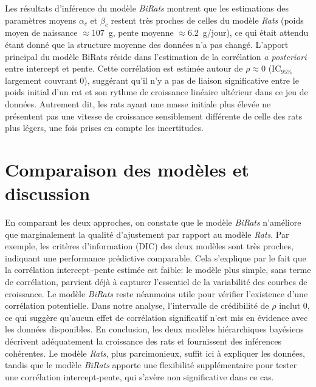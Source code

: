 \documentclass[12pt]{article}
\begin{document}
Les résultats d'inférence du modèle \textit{BiRats} montrent que les estimations des paramètres moyens $\alpha_c$ et $\beta_c$ restent très proches de celles du modèle \textit{Rats} (poids moyen de naissance $\approx 107$~g, pente moyenne $\approx 6.2$~g/jour), ce qui était attendu étant donné que la structure moyenne des données n'a pas changé. L'apport principal du modèle BiRats réside dans l'estimation de la corrélation \emph{a posteriori} entre intercept et pente. Cette corrélation est estimée autour de $\rho \approx 0$ (IC$_{95\%}$ largement couvrant 0), suggérant qu'il n'y a pas de liaison significative entre le poids initial d'un rat et son rythme de croissance linéaire ultérieur dans ce jeu de données. Autrement dit, les rats ayant une masse initiale plus élevée ne présentent pas une vitesse de croissance sensiblement différente de celle des rats plus légers, une fois prises en compte les incertitudes. 

\section{Comparaison des modèles et discussion}
En comparant les deux approches, on constate que le modèle \textit{BiRats} n'améliore que marginalement la qualité d'ajustement par rapport au modèle \textit{Rats}. Par exemple, les critères d'information (DIC) des deux modèles sont très proches, indiquant une performance prédictive comparable. Cela s'explique par le fait que la corrélation intercept--pente estimée est faible: le modèle plus simple, sans terme de corrélation, parvient déjà à capturer l'essentiel de la variabilité des courbes de croissance. Le modèle \textit{BiRats} reste néanmoins utile pour vérifier l'existence d'une corrélation potentielle. Dans notre analyse, l'intervalle de crédibilité de $\rho$ inclut 0, ce qui suggère qu'aucun effet de corrélation significatif n’est mis en évidence avec les données disponibles. En conclusion, les deux modèles hiérarchiques bayésiens décrivent adéquatement la croissance des rats et fournissent des inférences cohérentes. Le modèle \textit{Rats}, plus parcimonieux, suffit ici à expliquer les données, tandis que le modèle \textit{BiRats} apporte une flexibilité supplémentaire pour tester une corrélation intercept-pente, qui s’avère non significative dans ce cas.
\end{document}
